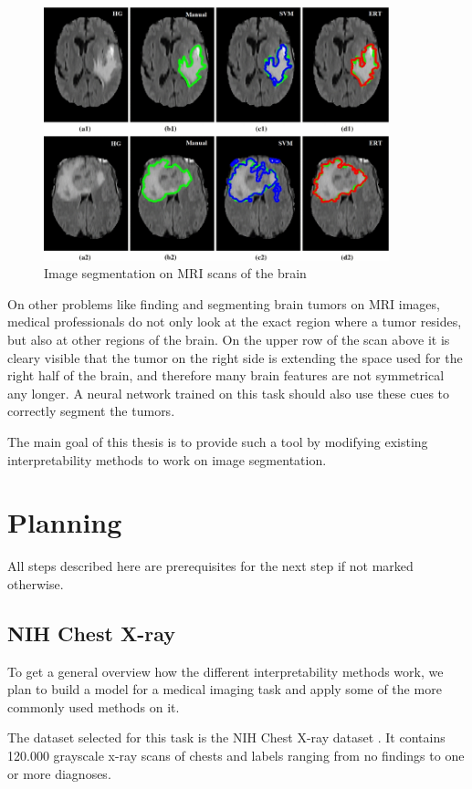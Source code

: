 \begin{figure}[H]
\centering
\caption{Image segmentation on MRI scans of the brain\cite{soltaninejad2017automated}}
\includegraphics[width=10cm]{images/brain_segmentation.jpg}
\end{figure}

On other problems like finding and segmenting brain tumors on MRI images, medical professionals do not only look at the exact region where a tumor resides, but also at other regions of the brain. On the upper row of the scan above it is cleary visible that the tumor on the right side is extending the space used for the right half of the brain, and therefore many brain features are not symmetrical any longer. A neural network trained on this task should also use these cues to correctly segment the tumors. 

The main goal of this thesis is to provide such a tool by modifying existing interpretability methods to work on image segmentation.

\section{Planning}
All steps described here are prerequisites for the next step if not marked otherwise.

\subsection{NIH Chest X-ray}
To get a general overview how the different interpretability methods work, we plan to build a model for a medical imaging task and apply some of the more commonly used methods on it.

The dataset selected for this task is the NIH Chest X-ray dataset \cite{wang2017chestx}. It contains 120.000 grayscale x-ray scans of chests and labels ranging from no findings to one or more diagnoses.


